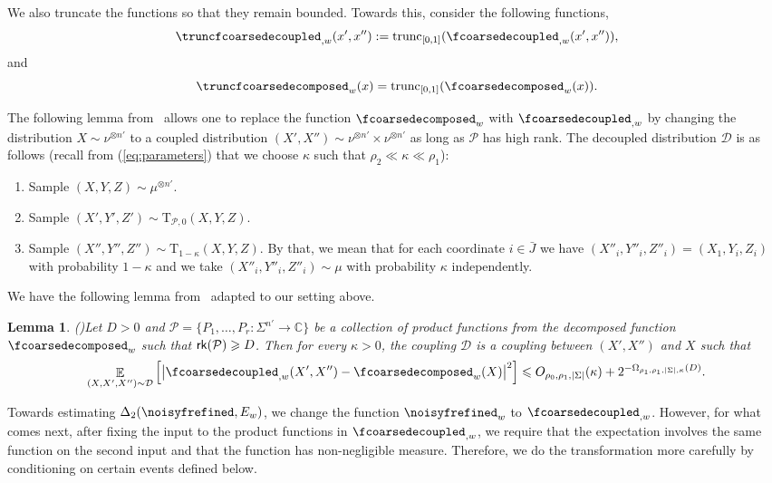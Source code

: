 \documentclass[11pt]{article}
\newtheorem{lemma}[thm]{Lemma}
\newcommand\card[1]{\left| {#1} \right|}
\newcommand\Expect[2]{{\mathop{\mathbb{E}}_{#1}\left[ {#2} \right]}}
\renewcommand\geq{\geqslant}
\renewcommand\leq{\leqslant}
\newcommand{\V}[1]{{#1}}
\begin{document}
We also truncate the functions so that they remain bounded. Towards this, consider the following functions,
    $$\truncfcoarsedecoupled_{,\V w}(\V x', \V x'') := \mathrm{trunc}_{[0,1]}(\fcoarsedecoupled_{, \V w}(\V x', \V x'')),$$
and
$$\truncfcoarsedecomposed_{\V w}(\V x) = \mathrm{trunc}_{[0,1]}(\fcoarsedecomposed_{\V w}(\V x)).$$



The following lemma from~\cite{BKM5} allows one to replace the function $\fcoarsedecomposed_{\V w} $ with $\fcoarsedecoupled_{, \V w}$ by changing the distribution $X\sim \nu^{\otimes n'}$ to a coupled distribution $(X', X'') \sim \nu^{\otimes n'}\times  \nu^{\otimes n'}$ as long as $\mathcal{P}$ has high rank. The decoupled distribution $\mathcal{D}$ is as follows (recall from (\ref{eq:parameters}) that we choose $\kappa$ such that $\rho_2\ll \kappa\ll \rho_1$):
   \begin{enumerate}
            \item Sample $(X,Y,Z)\sim \mu^{\otimes n'}$.
            \item Sample 
            $(X',Y',Z')\sim \mathrm{T}_{\mathcal{\mathcal{P}},0} (X,Y,Z)$.
            \item Sample $(X'',Y'',Z'')\sim \mathrm{T}_{1-\kappa}(X,Y,Z)$. By that, we mean that for each coordinate $i\in \bar{J}$ we have
$(X''_i,Y''_i,Z''_i) = (X_1, Y_i, Z_i)$ with probability $1-\kappa$ and we take $(X''_i,Y''_i,Z''_i)\sim \mu$ with probability $\kappa$ independently.
\end{enumerate}

We have the following lemma from~\cite{BKM5} adapted to our setting above.
\begin{lemma}(\cite[Lemma 6.7]{BKM5})\label{lem:decoupled_move}
		Let $D>0$ and $\mathcal{P} = \{P_1,\ldots,P_r\colon \Sigma^{n'}\to\mathbb{C}\}$ be a collection of
		product functions from the decomposed function $\fcoarsedecomposed_{\V w}$ such that ${\sf rk}(\mathcal{P})\geq D$. Then for every $\kappa>0$, the coupling $\mathcal{D}$ is a coupling between $(X',X'')$ and $X$ such that
		\[
		\Expect{(X,X',X'')\sim \mathcal{D}}{\card{\fcoarsedecoupled_{,\V w}(X',X'') - \fcoarsedecomposed_{\V w}(X)}^2}
		\leq O_{\rho_0, \rho_1, |\Sigma|}(\kappa) +  2^{-\Omega_{\rho_1, \rho_1,|\Sigma|,\kappa}(D)}.
		\]
	\end{lemma}

Towards estimating $\Delta_2(\noisyfrefined, E_{\V w})$, we change the function $\noisyfrefined_{\V w}$ to $\fcoarsedecoupled_{,\V w}$. However, for what comes next, after fixing the input to the product functions in $\fcoarsedecoupled_{,\V w}$, we require that the expectation involves the same function on the second input and that the function has non-negligible measure. Therefore, we do the transformation more carefully by conditioning on certain events defined below.
\end{document}

